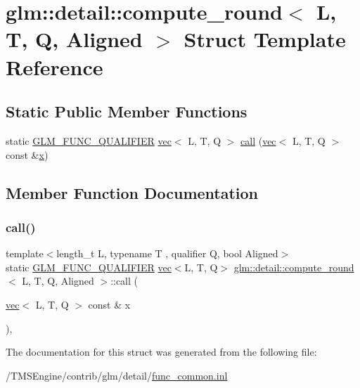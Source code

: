 \hypertarget{structglm_1_1detail_1_1compute__round}{}\section{glm\+:\+:detail\+:\+:compute\+\_\+round$<$ L, T, Q, Aligned $>$ Struct Template Reference}
\label{structglm_1_1detail_1_1compute__round}
\subsection*{Static Public Member Functions}
\begin{DoxyCompactItemize}
\item 
static \hyperlink{setup_8hpp_a33fdea6f91c5f834105f7415e2a64407}{G\+L\+M\+\_\+\+F\+U\+N\+C\+\_\+\+Q\+U\+A\+L\+I\+F\+I\+ER} \hyperlink{structglm_1_1vec}{vec}$<$ L, T, Q $>$ \hyperlink{structglm_1_1detail_1_1compute__round_a25a3c9a2b89285f11c983227f3e73956}{call} (\hyperlink{structglm_1_1vec}{vec}$<$ L, T, Q $>$ const \&\hyperlink{_s_d_l__opengl_8h_ad0e63d0edcdbd3d79554076bf309fd47}{x})
\end{DoxyCompactItemize}


\subsection{Member Function Documentation}
\mbox{\label{structglm_1_1detail_1_1compute__round_a25a3c9a2b89285f11c983227f3e73956}} 
\subsubsection{\texorpdfstring{call()}{call()}}
{\footnotesize\ttfamily template$<$length\+\_\+t L, typename T , qualifier Q, bool Aligned$>$ \\
static \hyperlink{setup_8hpp_a33fdea6f91c5f834105f7415e2a64407}{G\+L\+M\+\_\+\+F\+U\+N\+C\+\_\+\+Q\+U\+A\+L\+I\+F\+I\+ER} \hyperlink{structglm_1_1vec}{vec}$<$L, T, Q$>$ \hyperlink{structglm_1_1detail_1_1compute__round}{glm\+::detail\+::compute\+\_\+round}$<$ L, T, Q, Aligned $>$\+::call (\begin{DoxyParamCaption}\item[{\hyperlink{structglm_1_1vec}{vec}$<$ L, T, Q $>$ const \&}]{x }\end{DoxyParamCaption})\hspace{0.3cm}{\ttfamily [inline]}, {\ttfamily [static]}}



The documentation for this struct was generated from the following file\+:\begin{DoxyCompactItemize}
\item 
/\+T\+M\+S\+Engine/contrib/glm/detail/\hyperlink{func__common_8inl}{func\+\_\+common.\+inl}\end{DoxyCompactItemize}
